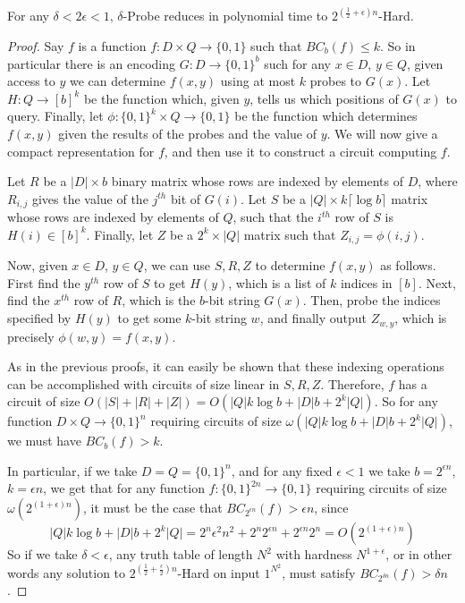 \begin{theorem}\label{thm:probe-circuit}
For any $\delta < 2\epsilon < 1$, {\sc $\delta$-Probe} reduces in polynomial time to {\sc $2^{(\frac{1}{2} + \epsilon)n}$-Hard}.
\end{theorem}
\begin{proof}

Say $f$ is a function $f: D \times Q \rightarrow \{0,1\}$ such that $BC_b(f) \leq k$. So in particular there is an encoding $G: D \rightarrow \{0,1\}^b$ such for any $x \in D$, $y \in Q$, given access to $y$ we can determine $f(x,y)$ using at most $k$ probes to $G(x)$. Let $H: Q \rightarrow [b]^k$ be the function which, given $y$, tells us which positions of $G(x)$ to query. Finally, let $\phi: \{0,1\}^k \times Q \rightarrow \{0,1\}$ be the function which determines $f(x,y)$ given the results of the probes and the value of $y$. We will now give a compact representation for $f$, and then use it to construct a circuit computing $f$.

Let $R$ be a $|D| \times b$ binary matrix whose rows are indexed by elements of $D$, where $R_{i,j}$ gives the value of the $j^{th}$ bit of $G(i)$. Let $S$ be a $|Q| \times k \lceil \log b \rceil$ matrix whose rows are indexed by elements of $Q$, such that the $i^{th}$ row of $S$ is $H(i) \in [b]^k$. Finally, let $Z$ be a $2^k \times |Q|$ matrix such that $Z_{i,j} = \phi(i,j)$.

Now, given $x \in D$, $y \in Q$, we can use $S,R,Z$ to determine $f(x,y)$ as follows. First find the $y^{th}$ row of $S$ to get $H(y)$, which is a list of $k$ indices in $[b]$. Next, find the $x^{th}$ row of $R$, which is the $b$-bit string $G(x)$. Then, probe the indices specified by $H(y)$ to get some $k$-bit string $w$, and finally output $Z_{w, y}$, which is precisely $\phi(w,y) = f(x,y)$.

As in the previous proofs, it can easily be shown that these indexing operations can be accomplished with circuits of size linear in $S,R,Z$. Therefore, $f$ has a circuit of size $O(|S| + |R| + |Z|) = O(|Q|k\log b + |D|b + 2^k|Q|)$. So for any function $D \times Q \rightarrow \{0,1\}^n$ requiring circuits of size $\omega(|Q|k\log b + |D|b + 2^k|Q|)$, we must have $BC_b(f) > k$. 

In particular, if we take $D = Q = \{0,1\}^n$, and for any fixed $\epsilon < 1$ we take $b= 2^{\epsilon n}$, $k = \epsilon n$, we get that for any function $f: \{0,1\}^{2n} \rightarrow \{0,1\}$ requiring circuits of size $\omega(2^{(1 +\epsilon) n})$, it must be the case that $BC_{2^{\epsilon n}}(f) > \epsilon n$, since 
\[
|Q|k\log b + |D|b + 2^k|Q| = 2^n \epsilon^2 n^2 + 2^n2^{\epsilon n} + 2^{\epsilon n}2^n = O(2^{(1+\epsilon) n})
\]
So if we take $\delta < \epsilon$, any truth table of length $N^2$ with hardness $N^{1+\epsilon}$, or in other words any solution to {\sc $2^{(\frac{1}{2} + \frac{\epsilon}{2})n}$-Hard} on input $1^{N^2}$, must satisfy $BC_{2^{\delta n}}(f) > \delta n$. 
\end{proof}

